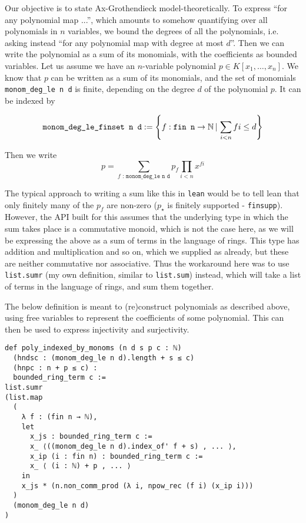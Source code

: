Our objective is to state Ax-Grothendieck model-theoretically.
To express ``for any polynomial map ...'',
which amounts to somehow quantifying over all polynomials in $n$ variables,
we bound the degrees of all the polynomials,
i.e. asking instead ``for any polynomial map with degree at most $d$''.
Then we can write the polynomial as a sum of its monomials,
with the coefficients as bounded variables.
Let us assume we have an $n$-variable polynomial $p \in K[x_{1},\dots,x_{n}]$.
We know that $p$ can be written as a sum of its monomials,
and the set of monomials \texttt{monom\_deg\_le n d} is finite,
depending on the degree $d$ of the polynomial $p$.
It can be indexed by

\[ \texttt{monom\_deg\_le\_finset n d} := \left\{ f : \texttt{fin n} \to \mathbb{N} \,|\, \sum_{i < n} f i \le d \right\}\]

Then we write
\[ p = \sum_{f\texttt{ : monom\_deg\_le n d}} p_{f}\prod_{i < n} x^{f i}\]

The typical approach to writing a sum like this in \texttt{lean} would be
to tell lean that only finitely many of the $p_{f}$ are non-zero
($p_{\star}$ is finitely supported - \texttt{finsupp}).
However, the API built for this assumes that the underlying
type in which the sum takes place is a commutative monoid,
which is not the case here,
as we will be expressing the above as a sum of terms
in the language of rings.
This type has addition and multiplication and so on,
which we supplied as  already,
but these are neither commutative nor associative.
Thus the workaround here was to use \texttt{list.sumr}
(my own definition, similar to \texttt{list.sum}) instead,
which will take a list of terms in the language of rings, and sum them together.

The below definition is meant to (re)construct polynomials as described above,
using free variables to represent the coefficients of some polynomial.
This can then be used to express injectivity and surjectivity.

\begin{lstlisting}
def poly_indexed_by_monoms (n d s p c : ℕ)
  (hndsc : (monom_deg_le n d).length + s ≤ c)
  (hnpc : n + p ≤ c) :
  bounded_ring_term c :=
list.sumr
(list.map
  (
    λ f : (fin n → ℕ),
    let
      x_js : bounded_ring_term c :=
      x_ ⟨((monom_deg_le n d).index_of' f + s) , ... ⟩,
      x_ip (i : fin n) : bounded_ring_term c :=
      x_ ⟨ (i : ℕ) + p , ... ⟩
    in
    x_js * (n.non_comm_prod (λ i, npow_rec (f i) (x_ip i)))
  )
  (monom_deg_le n d)
) \end{lstlisting}

